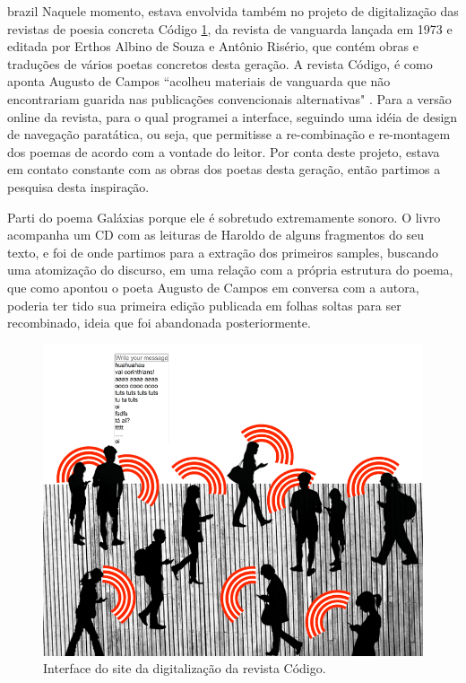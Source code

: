 \begin{otherlanguage*}{brazil}
Naquele momento, estava envolvida também no projeto de digitalização das revistas de poesia concreta Código \ref{codigo}, da revista de vanguarda lançada em 1973 e editada por Erthos Albino de Souza e Antônio Risério, que contém obras e traduções de vários poetas concretos desta geração. A revista Código, é como aponta Augusto de Campos ``acolheu materiais de vanguarda que não encontrariam guarida nas publicações convencionais alternativas" \cite{Scandurra2016}. Para a versão online da revista, para o qual programei a interface, seguindo uma idéia de design de navegação paratática, ou seja, que permitisse a re-combinação e re-montagem dos poemas de acordo com a vontade do leitor. Por conta deste projeto, estava em contato constante com as obras dos poetas desta geração, então partimos a pesquisa desta inspiração.

Parti do poema Galáxias porque ele é sobretudo extremamente sonoro. O livro acompanha um CD com as leituras de Haroldo de alguns fragmentos do seu texto, e foi de onde partimos para a extração dos primeiros samples, buscando uma atomização do discurso, em uma relação com a própria estrutura do poema, que como apontou o poeta Augusto de Campos em conversa com a autora, poderia ter tido sua primeira edição publicada em folhas soltas para ser recombinado, ideia que foi abandonada posteriormente.

\begin{figure}[htb]
    \caption{\label{codigo}Interface do site da digitalização da revista Código. }
    \begin{center}
    \includegraphics[width=1\linewidth]{pictures/banda_aberta_mob_crowd.png}
    \end{center}
\end{figure}


\end{otherlanguage*}
